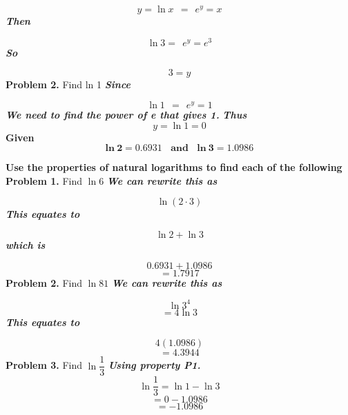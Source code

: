 \documentclass{report}
\begin{document}
$$ y = \ln{x} \ \ = \ \ e^y = x$$
\textit{\textbf{Then}}

$$ \ln{3} = \ \ e^y = e^3$$
\textit{\textbf{So}}

$$ 3 = y$$
\bigbreak \noindent
\textbf{Problem 2.} Find ln 1
\bigbreak \noindent
\textit{\textbf{Since}}

$$ \ln{1} \ \ = \ \ e^y = 1$$
\bigbreak \noindent
\textit{\textbf{We need to find the power of e that gives 1.}}
\bigbreak \noindent
\textit{\textbf{Thus}}
$$y = \ln{1} = 0$$
\pagebreak 
{}
\bigbreak \noindent
\q
\bigbreak \noindent
\textbf{Given} 
$$\mathbf{ln{\ 2} = 0.6931 \ \ \ \ and  \ \ \ \ ln{\ 3} = 1.0986}$$
\vspace{1mm}

\noindent\textbf{Use the properties of natural logarithms to find each of the following}
\bigbreak \noindent
\textbf{Problem 1.} Find $\ln{6}$
\bigbreak \noindent \bigbreak \noindent
\textit{\textbf{We can rewrite this as}}

$$\ln{(2 \cdot 3)}$$
\textit{\textbf{This equates to}}

$$ \ln{2} + \ln{3}$$
\textit{\textbf{which is}}

$$ 0.6931 + 1.0986$$
$$ = 1.7917$$
\bigbreak \noindent
\textbf{Problem 2.} Find $\ln{81}$
\bigbreak \noindent \bigbreak \noindent
\textit{\textbf{We can rewrite this as}}

$$\ln{3^4}$$
$$ = 4\ln{3}$$
\textit{\textbf{This equates to}}

$$ 4(1.0986)$$
$$ = 4.3944$$
\bigbreak \noindent
\textbf{Problem 3.} Find $\ln{\dfrac{1}{3}}$
\bigbreak \noindent
\textit{\textbf{Using property P1.}}
$$ \ln{\dfrac{1}{3}} = \ln{1} - \ln{3}$$
$$ = 0 - 1.0986$$
$$ = -1.0986$$
\end{document}
